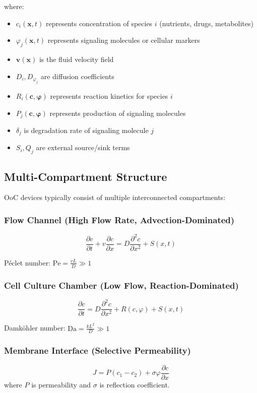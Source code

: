 \documentclass[11pt,a4paper]{article}
\begin{document}
where:
\begin{itemize}
    \item $c_i(\bm{x},t)$ represents concentration of species $i$ (nutrients, drugs, metabolites)
    \item $\varphi_j(\bm{x},t)$ represents signaling molecules or cellular markers
    \item $\bm{v}(\bm{x})$ is the fluid velocity field
    \item $D_i, D_{\varphi_j}$ are diffusion coefficients
    \item $R_i(\bm{c},\bm{\varphi})$ represents reaction kinetics for species $i$
    \item $P_j(\bm{c},\bm{\varphi})$ represents production of signaling molecules
    \item $\delta_j$ is degradation rate of signaling molecule $j$
    \item $S_i, Q_j$ are external source/sink terms
\end{itemize}

\subsection{Multi-Compartment Structure}

OoC devices typically consist of multiple interconnected compartments:

\subsubsection{Flow Channel (High Flow Rate, Advection-Dominated)}
\begin{equation}
\frac{\partial c}{\partial t} + v \frac{\partial c}{\partial x} = D \frac{\partial^2 c}{\partial x^2} + S(x,t)
\end{equation}

Péclet number: $\text{Pe} = \frac{vL}{D} \gg 1$

\subsubsection{Cell Culture Chamber (Low Flow, Reaction-Dominated)}
\begin{equation}
\frac{\partial c}{\partial t} = D \frac{\partial^2 c}{\partial x^2} + R(c,\varphi) + S(x,t)
\end{equation}

Damköhler number: $\text{Da} = \frac{kL^2}{D} \gg 1$

\subsubsection{Membrane Interface (Selective Permeability)}
\begin{equation}
J = P(c_1 - c_2) + \sigma\varphi \frac{\partial c}{\partial x}
\end{equation}
where $P$ is permeability and $\sigma$ is reflection coefficient.
\end{document}

